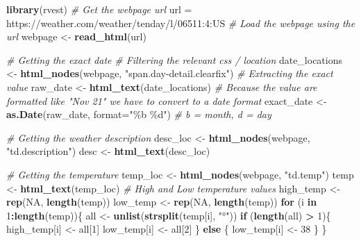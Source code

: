 \documentclass[
]{book}
\newenvironment{Shaded}{\begin{snugshade}}{\end{snugshade}}
\newcommand{\CommentTok}[1]{\textcolor[rgb]{0.56,0.35,0.01}{\textit{#1}}}
\newcommand{\ControlFlowTok}[1]{\textcolor[rgb]{0.13,0.29,0.53}{\textbf{#1}}}
\newcommand{\DataTypeTok}[1]{\textcolor[rgb]{0.13,0.29,0.53}{#1}}
\newcommand{\DecValTok}[1]{\textcolor[rgb]{0.00,0.00,0.81}{#1}}
\newcommand{\KeywordTok}[1]{\textcolor[rgb]{0.13,0.29,0.53}{\textbf{#1}}}
\newcommand{\NormalTok}[1]{#1}
\newcommand{\OperatorTok}[1]{\textcolor[rgb]{0.81,0.36,0.00}{\textbf{#1}}}
\newcommand{\OtherTok}[1]{\textcolor[rgb]{0.56,0.35,0.01}{#1}}
\newcommand{\StringTok}[1]{\textcolor[rgb]{0.31,0.60,0.02}{#1}}
\begin{document}
\begin{Shaded}
\begin{Highlighting}[]
\KeywordTok{library}\NormalTok{(rvest)}
\CommentTok{\# Get the webpage url}
\NormalTok{url =}\StringTok{ \textquotesingle{}https://weather.com/weather/tenday/l/06511:4:US\textquotesingle{}}
\CommentTok{\# Load the webpage using the url}
\NormalTok{webpage \textless{}{-}}\StringTok{ }\KeywordTok{read\_html}\NormalTok{(url)}

\CommentTok{\# Getting the exact date}
\CommentTok{\# Filtering the relevant css / location}
\NormalTok{date\_locations \textless{}{-}}\StringTok{ }\KeywordTok{html\_nodes}\NormalTok{(webpage, }\StringTok{"span.day{-}detail.clearfix"}\NormalTok{)}
\CommentTok{\# Extracting the exact value}
\NormalTok{raw\_date \textless{}{-}}\StringTok{ }\KeywordTok{html\_text}\NormalTok{(date\_locations)}
\CommentTok{\# Because the value are formatted like "Nov 21" we have to convert to a date format}
\NormalTok{exact\_date \textless{}{-}}\StringTok{ }\KeywordTok{as.Date}\NormalTok{(raw\_date, }\DataTypeTok{format=}\StringTok{"\%b \%d"}\NormalTok{) }\CommentTok{\# b = month, d = day}

\CommentTok{\# Getting the weather description}
\NormalTok{desc\_loc \textless{}{-}}\StringTok{ }\KeywordTok{html\_nodes}\NormalTok{(webpage, }\StringTok{"td.description"}\NormalTok{)}
\NormalTok{desc \textless{}{-}}\StringTok{ }\KeywordTok{html\_text}\NormalTok{(desc\_loc)}

\CommentTok{\# Getting the temperature}
\NormalTok{temp\_loc \textless{}{-}}\StringTok{ }\KeywordTok{html\_nodes}\NormalTok{(webpage, }\StringTok{"td.temp"}\NormalTok{)}
\NormalTok{temp \textless{}{-}}\StringTok{ }\KeywordTok{html\_text}\NormalTok{(temp\_loc)}
\CommentTok{\# High and Low temperature values}
\NormalTok{high\_temp \textless{}{-}}\StringTok{ }\KeywordTok{rep}\NormalTok{(}\OtherTok{NA}\NormalTok{, }\KeywordTok{length}\NormalTok{(temp))}
\NormalTok{low\_temp \textless{}{-}}\StringTok{ }\KeywordTok{rep}\NormalTok{(}\OtherTok{NA}\NormalTok{, }\KeywordTok{length}\NormalTok{(temp))}
\ControlFlowTok{for}\NormalTok{ (i }\ControlFlowTok{in} \DecValTok{1}\OperatorTok{:}\KeywordTok{length}\NormalTok{(temp))\{}
\NormalTok{all \textless{}{-}}\StringTok{ }\KeywordTok{unlist}\NormalTok{(}\KeywordTok{strsplit}\NormalTok{(temp[i], }\StringTok{"°"}\NormalTok{))}
\ControlFlowTok{if}\NormalTok{ (}\KeywordTok{length}\NormalTok{(all) }\OperatorTok{\textgreater{}}\StringTok{ }\DecValTok{1}\NormalTok{)\{}
\NormalTok{high\_temp[i] \textless{}{-}}\StringTok{ }\NormalTok{all[}\DecValTok{1}\NormalTok{]}
\NormalTok{low\_temp[i] \textless{}{-}}\StringTok{ }\NormalTok{all[}\DecValTok{2}\NormalTok{]}
\NormalTok{\} }\ControlFlowTok{else}\NormalTok{ \{}
\NormalTok{low\_temp[i] \textless{}{-}}\StringTok{ }\DecValTok{38}
\NormalTok{\}}
\NormalTok{\}}


\end{Highlighting}
\end{Shaded}
\end{document}
